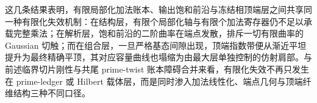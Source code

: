 \noindent
这几条结果表明，有限局部化加法账本、输出饱和前沿与冻结相顶端层之间共享同一种有限化失效机制：在结构层，有限个局部化轴与有限个加法寄存器仍不足以承载完整乘法；在解析层，饱和前沿的二阶曲率在端点发散，排斥一切有限曲率的 Gaussian 切触；而在组合层，一旦严格基态间隙出现，顶端指数带便从渐近平坦提升为最终精确平顶，其对应容量曲线也塌缩为由最大层单独控制的仿射肩部。与前述临界切片刚性与共尾 prime-twist 账本障碍合并来看，有限化失效不再只发生在 prime-ledger 或 Hilbert 载体层，而是同时渗入加法线性化、端点几何与顶端纤维结构三种不同口径。

\endinput
\paragraph{有限局部化加法账本、输出端点非高斯曲率与严格基态间隙的精确平顶}
在有限局部化 rank-one 轴的全局障碍、输出位势右端点的对数尖点、固定单位根模态的四阶展开，以及冻结相中的严格基态间隙与容量仿射段都已建立之后，还可继续抽取出下列几条派生结论。它们分别把有限局部化加法账本的结构失效、饱和前沿的非高斯曲率发散、基本单位根慢模对 Perron 指数的刚性贴近，以及顶端指数带中的尾计数精确平顶与容量精确肩部统一到同一条终端链上。

\begin{theorem}[有限局部化圆因子与有限加法寄存器不足以忠实线性化完整乘法]\label{thm:xi-time-part9w-finite-localized-additive-ledger-obstruction}
设 \(S_1,\dots,S_r\subset\mathbb P\) 为有限素数集，并记
\[
G_{S_i}:=\ZZ[S_i^{-1}].
\]
则对任意 \(k\in\ZZ_{\ge 0}\)，都不存在交换幺半群单射
\[
\Phi:\NN_{\times}\hookrightarrow
\Bigl(\bigoplus_{i=1}^{r}G_{S_i}\Bigr)\oplus(\NN^k,+).
\]
\end{theorem}
\begin{proof}
设
\[
\iota:(\NN^k,+)\hookrightarrow(\ZZ^k,+)
\]
为自然嵌入。若存在所述 \(\Phi\)，则
\[
(\mathrm{id}\oplus\iota)\circ\Phi:
\NN_{\times}\hookrightarrow
\Bigl(\bigoplus_{i=1}^{r}G_{S_i}\Bigr)\oplus\ZZ^k
\]
仍为幺半群单射。把右端改写为
\[
\mathbf S:=(S_1,\dots,S_r),
\qquad
\mathcal L_{k,\mathbf S}:=\ZZ^k\oplus G_{S_1}\oplus\cdots\oplus G_{S_r},
\]
便与定理 \ref{thm:xi-time-part62debb-finite-localization-axes-no-full-multiplicative-host} 直接矛盾。故所述 \(\Phi\) 不存在。证毕。
\end{proof}

